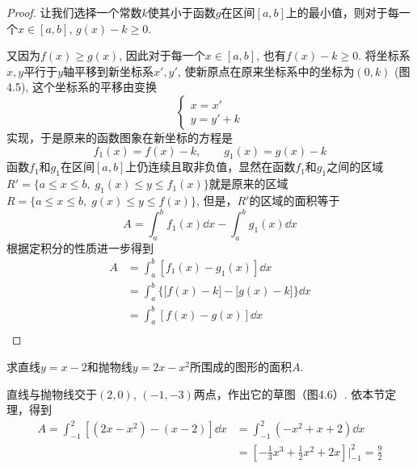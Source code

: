 \begin{proof}
让我们选择一个常数$k$使其小于函数$g$在区间$[a,b]$上的最小值，则对于每一个$x\in [a,b]$, $g(x)
-k\ge 0$.

又因为$f(x)\ge g(x)$, 因此对于每一个$x\in [a,b]$, 
也有$f(x)-k\ge 0$. 将坐标系$x,y$平行于$y$轴平移到新坐标系$x',y'$, 使新原点在原来坐标系中的坐标为$(0,k)$ (图4.5), 这个坐标系的平移由变换
\[\begin{cases}
    x=x'\\
    y=y'+k
\end{cases}\]
实现，于是原来的函数图象在新坐标的方程是
\[f_1 (x) =f (x) -k,\qquad g_1 (x) =g (x) -k\]
函数$f_1$和$g_1$在区间$[a,b]$上仍连续且取非负值，显然在函数$f_1$和$g_1$之间的区域$R'=\{a\le x\le b,\; g_1(x)\le y\le f_1(x)\}$就是原来的区域$R=\{a\le x\le b,\; g(x)\le y\le f(x)\}$, 但是，$R'$的区域的面积等于
\[A=\int^b_a f_1(x)\dd x-\int^b_a g_1(x)\dd x\]
根据定积分的性质进一步得到
\[\begin{split}
    A&=\int^b_a [f_1(x)-g_1(x)]\dd x\\
    &=\int^b_a \Big\{\big[f(x)-k\big]-\big[g(x)-k\big]\Big\}\dd x\\
    &=\int^b_a [f(x)-g(x)]\dd x\\
\end{split}\]
\end{proof}

\begin{example}
求直线$y=x-2$和抛物线$y=2x-x^2$所围成的图形的面积$A$.
\end{example}

\begin{solution}
直线与抛物线交于$(2, 0)$, $(-1,-3)$两点，作出它的草图（图4.6）. 依本节定理，得到
\[\begin{split}
    A=\int^2_{-1} [(2x-x^2)-(x-2)]\dd x
    &=\int^2_{-1} (-x^2+x+2)\dd x\\
    &=\left[-\frac{1}{3}x^3+\frac{1}{2}x^2+2x\right]\Bigg|^2_{-1}=\frac{9}{2}
\end{split}\]
\end{solution}


